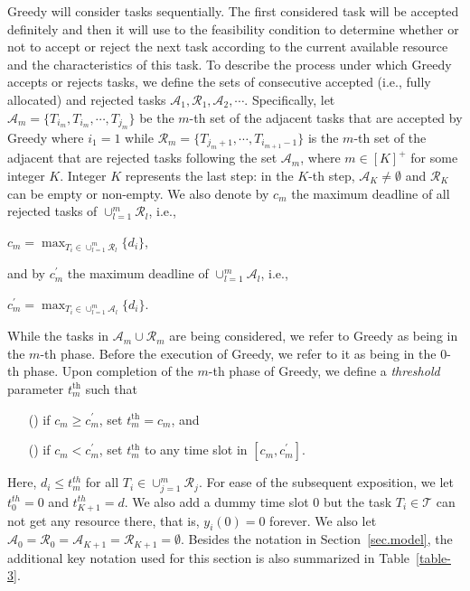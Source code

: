 \documentclass[10pt,journal,compsoc]{IEEEtran}
\newcommand{\tth}{t^{\textrm{th}}}
\newcommand{\rmnum}[1]{\romannumeral #1}
\begin{document}
Greedy will consider tasks sequentially. The first considered task will be accepted definitely and then it will use to the feasibility condition to determine whether or not to accept or reject the next task according to the current available resource and the characteristics of this task. To describe the process under which Greedy accepts or rejects tasks, we define the sets of consecutive accepted (i.e., fully allocated) and rejected tasks $\mathcal{A}_1, \mathcal{R}_1, \mathcal{A}_2, \cdots$. Specifically, let $\mathcal{A}_{m}=\{T_{i_{m}}, T_{i_{m}}, \cdots, T_{j_{m}}\}$ be the $m$-th set of the adjacent tasks that are accepted by Greedy where $i_{1}=1$ while $\mathcal{R}_{m}=\{ T_{j_{m}+1}, \cdots, T_{i_{m+1}-1} \}$ is the $m$-th set of the adjacent that are rejected tasks following the set $\mathcal{A}_{m}$, where $m\in[K]^{+}$ for some integer $K$.
Integer $K$ represents the last step: in the $K$-th step, $\mathcal{A}_{K} \neq \emptyset$ and $\mathcal{R}_{K}$ can be empty or non-empty. We also denote by $c_{m}$ the maximum deadline of all rejected tasks of $\cup_{l=1}^{m}{\mathcal{R}_{l}}$, i.e.,
\begin{center}
$c_{m}=\max_{T_{i}\in \cup_{l=1}^{m}{\mathcal{R}_{l}}}{\{ d_{i} \}}$,
\end{center}
and by $c_{m}^{\prime}$ the maximum deadline of $\cup_{l=1}^{m}{\mathcal{A}_{l}}$, i.e.,
\begin{center}
$c_{m}^{\prime}=\max_{T_{i}\in \cup_{l=1}^{m}{\mathcal{A}_{l}}}\{ d_{i} \}$.
\end{center}
While the tasks in $\mathcal{A}_{m}\cup\mathcal{R}_{m}$ are being considered, we refer to Greedy as being in the $m$-th phase. Before the execution of Greedy, we refer to it as being in the 0-th phase. Upon completion of the $m$-th phase of Greedy, we define a {\em threshold} parameter $\tth_m$ such that
\begin{enumerate}
 \setlength\itemsep{0.35em}
\item [(\rmnum{1})] if $c_m\ge c^{\prime}_m$, set $\tth_m = c_m$, and
\item [(\rmnum{2})] if $c_m< c^{\prime}_m$, set $\tth_m$ to any time slot in $[c_m, c^{\prime}_m]$.
\end{enumerate}
Here, $d_{i}\leq t_{m}^{th}$ for all $T_{i}\in\cup_{j=1}^{m}{\mathcal{R}_{j}}$. For ease of the subsequent exposition, we let $t_{0}^{th}=0$ and $t_{K+1}^{th}=d$. We also add a dummy time slot 0 but the task $T_{i}\in\mathcal{T}$ can not get any resource there, that is, $y_{i}(0)=0$ forever. We also let $\mathcal{A}_{0}=\mathcal{R}_{0}=\mathcal{A}_{K+1}=\mathcal{R}_{K+1}=\emptyset$. Besides the notation in Section~\ref{sec.model}, the additional key notation used for this section is also summarized in Table~\ref{table-3}.
\end{document}
